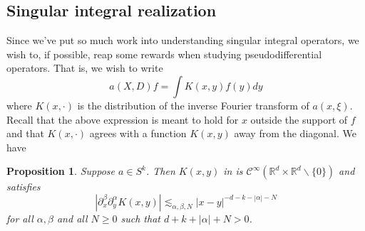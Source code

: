\documentclass[11pt]{article}
\newtheorem{prop}[thm]{Proposition}
\theoremstyle{remark}
\newcommand{\calC}{\mathcal{C}}
\newcommand{\1}{\textbf{1}}
\newcommand{\lle}{\lesssim}
\newcommand{\bbR}{\mathbb{R}}
\begin{document}
\subsection*{Singular integral realization}
Since we've put so much work into understanding singular integral operators, we wish to, if possible, reap some rewards when studying pseudodifferential operators. That is, we wish to write
\[
a(X,D)f = \int K(x,y) f(y) dy
\]
where $K(x,\cdot)$ is the distribution of the inverse Fourier transform of $a(x,\xi)$. Recall that the above expression is meant to hold for $x$ outside the support of $f$ and that $K(x,\cdot)$ agrees with a function $K(x,y)$ away from the diagonal. We have
\begin{prop}
Suppose $a \in S^k$. Then $K(x,y)$ in is $\calC^\infty(\bbR^d \times \bbR^d \backslash \{0\})$ and satisfies
\[
|\partial_x^\beta \partial_y^\alpha K(x,y)| \lle_{\alpha,\beta,N} |x-y|^{-d-k-|\alpha| -N}
\]
for all $\alpha, \beta$ and all $N \geq 0$ such that $d+k+|\alpha| +N > 0$.
\label{prop:singker}
\end{prop}
\end{document}
